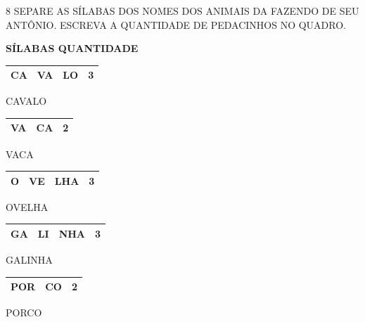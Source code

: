 \begin{escola}
\num{8} SEPARE AS SÍLABAS DOS NOMES DOS ANIMAIS DA FAZENDO DE SEU ANTÔNIO. ESCREVA A QUANTIDADE DE PEDACINHOS NO QUADRO.



\textbf{SÍLABAS QUANTIDADE}

\begin{longtable}[]{@{}llll@{}}
\toprule
CA & VA & LO & 3\tabularnewline
\bottomrule
\end{longtable}

CAVALO

\begin{longtable}[]{@{}lll@{}}
\toprule
VA & CA & 2\tabularnewline
\bottomrule
\end{longtable}


VACA


\begin{longtable}[]{@{}llll@{}}
\toprule
O & VE & LHA & 3\tabularnewline
\bottomrule
\end{longtable}

OVELHA


\begin{longtable}[]{@{}llll@{}}
\toprule
GA & LI & NHA & 3\tabularnewline
\bottomrule
\end{longtable}

GALINHA

\begin{longtable}[]{@{}lll@{}}
\toprule
POR & CO & 2\tabularnewline
\bottomrule
\end{longtable}


PORCO




\end{escola}
